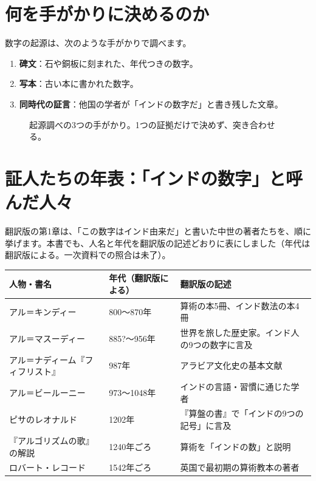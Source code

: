 \documentclass[a4paper,11pt,openany]{ltjsbook}
\begin{document}
\section{何を手がかりに決めるのか}

数字の起源は、次のような手がかりで調べます。

\begin{enumerate}[leftmargin=2em]
\item \textbf{碑文}：石や銅板に刻まれた、年代つきの数字。
\item \textbf{写本}：古い本に書かれた数字。
\item \textbf{同時代の証言}：他国の学者が「インドの数字だ」と書き残した文章。
\end{enumerate}

\begin{figure}[htbp]
\centering
{}
\caption{起源調べの3つの手がかり。1つの証拠だけで決めず、突き合わせる。}
\end{figure}

\section{証人たちの年表：「インドの数字」と呼んだ人々}

翻訳版の第1章は、「この数字はインド由来だ」と書いた中世の著者たちを、順に挙げます。本書でも、人名と年代を翻訳版の記述どおりに表にしました（年代は翻訳版による。一次資料での照合は未了）。

\begin{center}
\begin{tabular}{p{4.2cm}p{3.4cm}p{5cm}}
\toprule
人物・書名 & 年代（翻訳版による） & 翻訳版の記述\\
\midrule
アル＝キンディー & 800〜870年 & 算術の本5冊、インド数法の本4冊\\
アル＝マスーディー & 885?〜956年 & 世界を旅した歴史家。インド人の9つの数字に言及\\
アル＝ナディーム『フィフリスト』 & 987年 & アラビア文化史の基本文献\\
アル＝ビールーニー & 973〜1048年 & インドの言語・習慣に通じた学者\\
ピサのレオナルド & 1202年 & 『算盤の書』で「インドの9つの記号」に言及\\
『アルゴリズムの歌』の解説 & 1240年ごろ & 算術を「インドの数」と説明\\
ロバート・レコード & 1542年ごろ & 英国で最初期の算術教本の著者\\
\bottomrule
\end{tabular}
\end{center}
\end{document}

